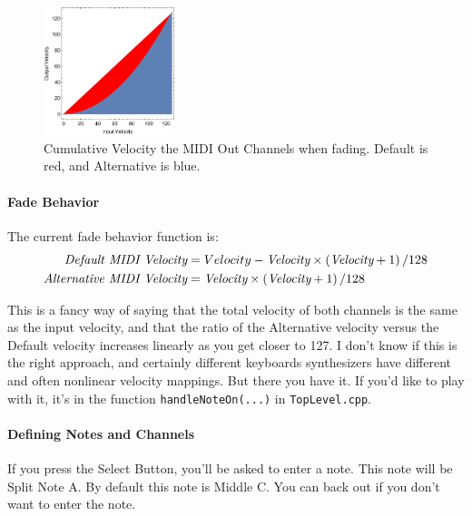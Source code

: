 \documentclass{article}
\begin{document}
\begin{figure}
\vspace{-3.5em}\includegraphics[width=1.5in]{Fade}
\vspace{-2em}\caption{\small Cumulative Velocity the MIDI Out Channels when fading.  Default is {\color{red}red}, and Alternative is {\color{blue} blue}.}
\vspace{-3em}
\label{splitter}
\end{figure}

\paragraph{Fade Behavior}  The current fade behavior function is:
\[
\begin{split}
\text{\it Default MIDI Velocity} &= Velocity - \text{\it Velocity} \times \left( \text{\it Velocity} + 1 \right) / 128\\
\text{\it Alternative MIDI Velocity} &= \text{\it Velocity} \times \left( \text{\it Velocity} + 1 \right) / 128
\end{split}
\]

This is a fancy way of saying that the total velocity of both channels is the same as the input velocity, and that the ratio of the Alternative velocity versus the Default velocity increases linearly as you get closer to 127.  I don't know if this is the right approach, and certainly different keyboards synthesizers have different and often nonlinear velocity mappings.  But there you have it.  If you'd like to play with it, it's in the function \texttt{handleNoteOn(...)} in \texttt{TopLevel.cpp}.

\clearpage

\paragraph{Defining Notes and Channels}

If you press the Select Button, you'll be asked to enter a note.  This note will be Split Note A.  By default this note is Middle C.  You can back out if you don't want to enter the note.
\end{document}
